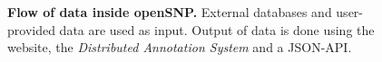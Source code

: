 \documentclass[10pt]{article}
\begin{document}
\begin{figure}[!ht]
	\caption{
	{\bf Flow of data inside openSNP.} External databases and user-provided data are used as input. Output of data is done using the website, the \emph{Distributed Annotation System} and a JSON-API.} 
	\label{Figure4_label}
\end{figure}



\end{document}
